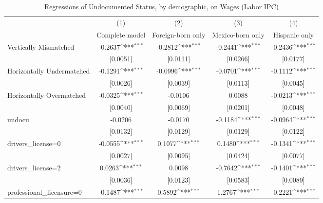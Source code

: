\begin{table}[htbp]\centering
\def\sym#1{\ifmmode^{#1}\else\(^{#1}\)\fi}
\caption{Regressions of Undocumented Status, by demographic, on Wages (Labor IPC)}
\begin{tabular}{l*{4}{c}}
\toprule
                    &\multicolumn{1}{c}{(1)}         &\multicolumn{1}{c}{(2)}         &\multicolumn{1}{c}{(3)}         &\multicolumn{1}{c}{(4)}         \\
                    &Complete model         &Foreign-born only         &Mexico-born only         &Hispanic only         \\
\midrule
Vertically Mismatched&     -0.2637\sym{***}&     -0.2812\sym{***}&     -0.2441\sym{***}&     -0.2436\sym{***}\\
                    &    [0.0051]         &    [0.0111]         &    [0.0266]         &    [0.0177]         \\
\addlinespace
Horizontally Undermatched&     -0.1291\sym{***}&     -0.0996\sym{***}&     -0.0701\sym{***}&     -0.1112\sym{***}\\
                    &    [0.0026]         &    [0.0039]         &    [0.0113]         &    [0.0045]         \\
\addlinespace
Horizontally Overmatched&     -0.0325\sym{***}&     -0.0106         &      0.0088         &     -0.0213\sym{***}\\
                    &    [0.0040]         &    [0.0069]         &    [0.0201]         &    [0.0048]         \\
\addlinespace
undocu              &     -0.0206         &     -0.0170         &     -0.1184\sym{***}&     -0.0964\sym{***}\\
                    &    [0.0132]         &    [0.0129]         &    [0.0129]         &    [0.0122]         \\
\addlinespace
drivers\_license=0   &     -0.0555\sym{***}&      0.1077\sym{***}&      0.1480\sym{***}&     -0.1341\sym{***}\\
                    &    [0.0027]         &    [0.0095]         &    [0.0424]         &    [0.0077]         \\
\addlinespace
drivers\_license=2   &      0.0263\sym{***}&      0.0098         &     -0.7642\sym{***}&     -0.1401\sym{***}\\
                    &    [0.0036]         &    [0.0123]         &    [0.0583]         &    [0.0089]         \\
\addlinespace
professional\_licensure=0&     -0.1487\sym{***}&      0.5892\sym{***}&      1.2767\sym{***}&     -0.2221\sym{***}\\

\end{tabular}
\end{table}
